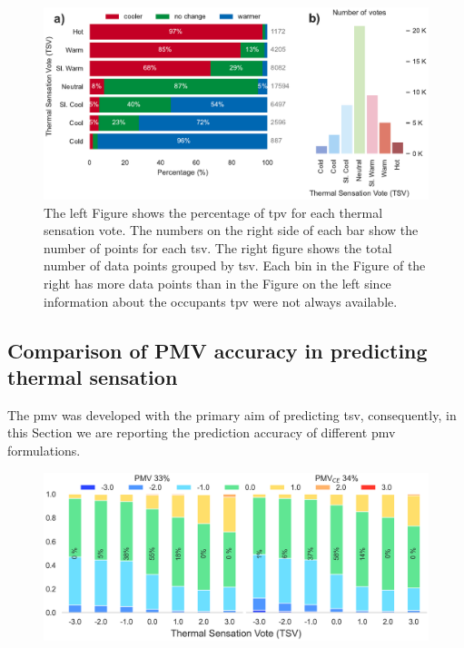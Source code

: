 \begin{figure}[htb!]
    \centering
    \includegraphics[width=\textwidth]{figures/bar_plot_tp_by_ts}
    \caption{The left Figure shows the percentage of \ac{tpv} for each thermal sensation vote.
    The numbers on the right side of each bar show the number of points for each \ac{tsv}.
    The right figure shows the total number of data points grouped by \ac{tsv}.
    Each bin in the Figure of the right has more data points than in the Figure on the left since information about the occupants \ac{tpv} were not always available.}
    \label{fig:bar_plot_tp_by_ts}
\end{figure}

\subsection{Comparison of PMV accuracy in predicting thermal sensation}\label{subsec:model-accuracy-comparison-in-predicting-thermal-sensation}
The \ac{pmv} was developed with the primary aim of predicting \ac{tsv}, consequently, in this Section we are reporting the prediction accuracy of different \ac{pmv} formulations.

\begin{figure}[htb!]
    \centering
    \includegraphics[width=\textwidth]{figures/bar_stacked_model_accuracy}
    \caption{}
    \label{fig:bar_stacked_model_accuracy}
\end{figure}


